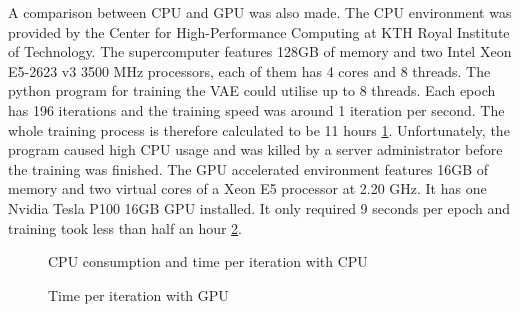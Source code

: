 \documentclass[11pt,a4paper]{report}
\begin{document}
A comparison between CPU and GPU was also made. The CPU environment was provided by the Center for High-Performance Computing at KTH Royal Institute of Technology. The supercomputer features 128GB of memory and two Intel Xeon E5-2623 v3 3500 MHz processors, each of them has 4 cores and 8 threads. The python program for training the VAE could utilise up to 8 threads. Each epoch has 196 iterations and the training speed was around 1 iteration per second. The whole training process is therefore calculated to be 11 hours \ref{fig:pdc}. Unfortunately, the program caused high CPU usage and was killed by a server administrator before the training was finished. The GPU accelerated environment features 16GB of memory and two virtual cores of a Xeon E5 processor at 2.20 GHz. It has one Nvidia Tesla P100 16GB GPU installed. It only required 9 seconds per epoch and training took less than half an hour \ref{fig:colab}.


\begin{figure}[h!]
\noindent{}
\caption{CPU consumption and time per iteration with CPU}
  \label{fig:pdc}
\end{figure}

\begin{figure}[h!]
\noindent{}
\caption{Time per iteration with GPU}
  \label{fig:colab}
\end{figure}
\end{document}
